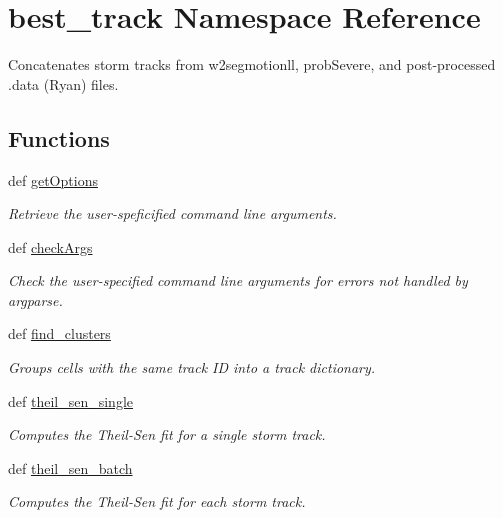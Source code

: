 \hypertarget{namespacebest__track}{\section{best\-\_\-track Namespace Reference}
\label{namespacebest__track}
}


Concatenates storm tracks from w2segmotionll, prob\-Severe, and post-\/processed .data (Ryan) files.  


\subsection*{Functions}
\begin{DoxyCompactItemize}
\item 
\hypertarget{namespacebest__track_a09088a9013df27853bf9f485f05f0a72}{def \hyperlink{namespacebest__track_a09088a9013df27853bf9f485f05f0a72}{get\-Options}}\label{namespacebest__track_a09088a9013df27853bf9f485f05f0a72}

\begin{DoxyCompactList}\small\item\em Retrieve the user-\/speficified command line arguments. \end{DoxyCompactList}\item 
def \hyperlink{namespacebest__track_a6b44d523a11a359018dc76509518b179}{check\-Args}
\begin{DoxyCompactList}\small\item\em Check the user-\/specified command line arguments for errors not handled by argparse. \end{DoxyCompactList}\item 
def \hyperlink{namespacebest__track_a74c5b356df078415ee8680f2ad29de9e}{find\-\_\-clusters}
\begin{DoxyCompactList}\small\item\em Groups cells with the same track I\-D into a track dictionary. \end{DoxyCompactList}\item 
def \hyperlink{namespacebest__track_adc61e2f0460ec2e17cd17d720acac58a}{theil\-\_\-sen\-\_\-single}
\begin{DoxyCompactList}\small\item\em Computes the Theil-\/\-Sen fit for a single storm track. \end{DoxyCompactList}\item 
def \hyperlink{namespacebest__track_ae3b3ae8d6c815814fe4c07f614024a4a}{theil\-\_\-sen\-\_\-batch}
\begin{DoxyCompactList}\small\item\em Computes the Theil-\/\-Sen fit for each storm track. \end{DoxyCompactList}\end{DoxyCompactItemize}
